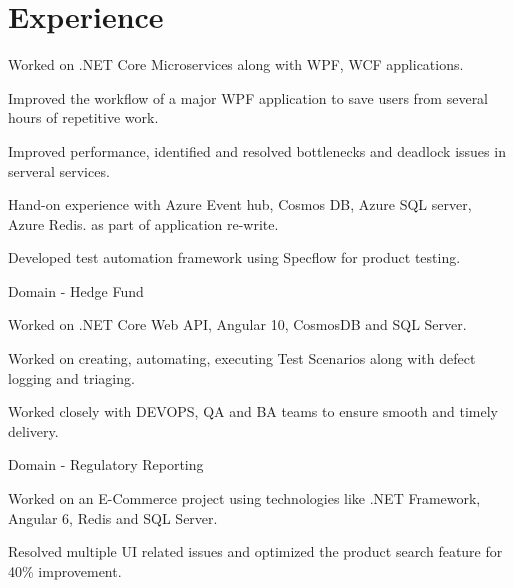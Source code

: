 \documentclass[]{deedy-resume-openfont}
\begin{document}
\begin{minipage}[t]{0.66\textwidth} 


\section{Experience}
\vspace{\topsep} %
\begin{tightemize}
\item Worked on .NET Core Microservices along with WPF, WCF applications.
\item Improved the workflow of a major WPF application to save users from several hours of repetitive work.
\item Improved performance, identified and resolved bottlenecks and deadlock issues in serveral services.
\item Hand-on experience with Azure Event hub, Cosmos DB, Azure SQL server, Azure Redis.
as part of application re-write.
\item Developed test automation framework using Specflow for product testing.
\item Domain - Hedge Fund
\end{tightemize}
\sectionsep

\begin{tightemize}
\item Worked on .NET Core Web API, Angular 10, CosmosDB and SQL Server.
\item Worked on creating, automating, executing Test Scenarios along with defect logging and triaging.
\item Worked closely with DEVOPS, QA and BA teams to ensure smooth and timely delivery.
\item Domain - Regulatory Reporting
\end{tightemize}
\sectionsep



\begin{tightemize}
\item Worked on an E-Commerce project using technologies like .NET Framework, Angular 6, Redis and SQL Server.
\item Resolved multiple UI related issues and optimized the product search feature for 40\% improvement.
\end{tightemize}
\sectionsep


\end{minipage}
\end{document}
